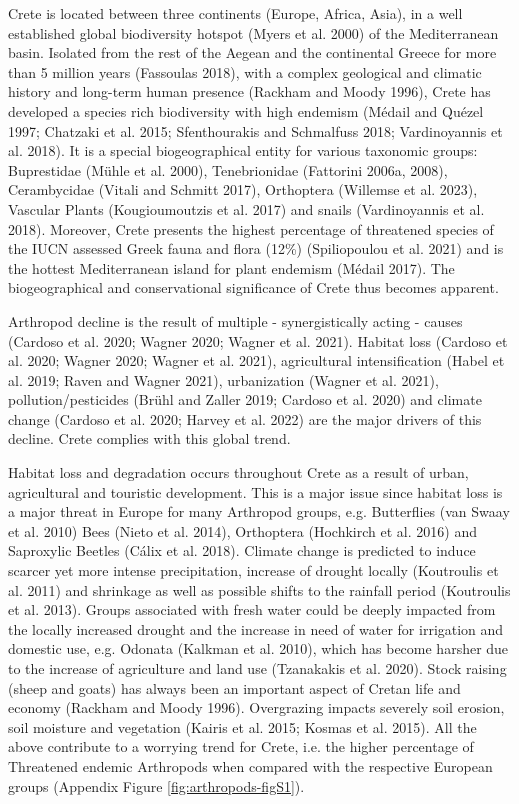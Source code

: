 Crete is located between three continents (Europe, Africa, Asia), in a
well established global biodiversity hotspot (Myers et al. 2000) of the
Mediterranean basin. Isolated from the rest of the Aegean and the continental
Greece for more than 5 million years (Fassoulas 2018), with a complex geological
and climatic history and long-term human presence (Rackham and Moody 1996),
Crete has developed a species rich biodiversity with high endemism
(Médail and Quézel 1997; Chatzaki et al. 2015; Sfenthourakis and Schmalfuss 2018; Vardinoyannis et al. 2018).
It is a special biogeographical entity for various taxonomic groups: Buprestidae (Mühle et al. 2000),
Tenebrionidae (Fattorini 2006a, 2008), Cerambycidae (Vitali and Schmitt 2017),
Orthoptera (Willemse et al. 2023), Vascular Plants (Kougioumoutzis et al. 2017)
and snails (Vardinoyannis et al. 2018). Moreover, Crete presents the highest
percentage of threatened species of the IUCN assessed Greek fauna and flora
(12\%) (Spiliopoulou et al. 2021) and is the hottest Mediterranean island for
plant endemism (Médail 2017). The biogeographical and conservational
significance of Crete thus becomes apparent.

Arthropod decline is the result of multiple - synergistically acting - causes (Cardoso et al. 2020; Wagner 2020; Wagner et al. 2021).
Habitat loss (Cardoso et al. 2020; Wagner 2020; Wagner et al. 2021),
agricultural intensification (Habel et al. 2019; Raven and Wagner 2021),
urbanization (Wagner et al. 2021), pollution/pesticides (Brühl and Zaller 2019; Cardoso et al. 2020)
and climate change (Cardoso et al. 2020; Harvey et al. 2022) are the major
drivers of this decline. Crete complies with this global trend.

Habitat loss and degradation occurs throughout Crete as a result of urban,
agricultural and touristic development. This is a major issue since habitat
loss is a major threat in Europe for many Arthropod groups,
e.g. Butterflies (van Swaay et al. 2010) Bees (Nieto et al. 2014),
Orthoptera (Hochkirch et al. 2016) and Saproxylic Beetles (Cálix et al. 2018).
Climate change is predicted to induce scarcer yet more intense precipitation,
increase of drought locally (Koutroulis et al. 2011) and shrinkage as well as
possible shifts to the rainfall period (Koutroulis et al. 2013). Groups
associated with fresh water could be deeply impacted from the locally increased
drought and the increase in need of water for irrigation and domestic use,
e.g. Odonata (Kalkman et al. 2010), which has become harsher due to the
increase of agriculture and land use (Tzanakakis et al. 2020). Stock raising
(sheep and goats) has always been an important aspect of Cretan life and
economy (Rackham and Moody 1996). Overgrazing impacts severely soil erosion,
soil moisture and vegetation (Kairis et al. 2015; Kosmas et al. 2015). All the
above contribute to a worrying trend for Crete, i.e. the higher percentage of
Threatened endemic Arthropods when compared with the respective European
groups (Appendix Figure \ref{fig:arthropods-figS1}).

